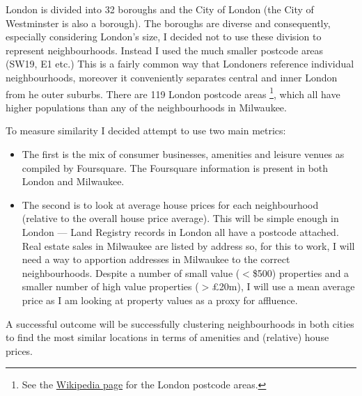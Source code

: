 \documentclass[a4paper,12pt,final,UKenglish]{article}
\begin{document}
            London is divided into 32 boroughs and the City of London (the City of Westminster is also a borough).
            The boroughs are diverse and consequently, especially considering London's size, I decided not to use these division to represent neighbourhoods.
            Instead I used the much smaller postcode areas (SW19, E1 etc.)
            This is a fairly common way that Londoners reference individual neighbourhoods, moreover it conveniently separates central and inner London from he outer suburbs.
            There are 119 London postcode areas%
            \footnote{See the \href{https://en.wikipedia.org/wiki/London\_postal\_district}{Wikipedia page} for the London postcode areas.},
            which all have higher populations than any of the neighbourhoods in Milwaukee.

            To measure similarity I decided attempt to use two main metrics:
            \begin{itemize}
                \item The first is the mix of consumer businesses, amenities and leisure venues as compiled by Foursquare.
                The Foursquare information is present in both London and Milwaukee.
                \item The second is to look at average house prices for each neighbourhood (relative to the overall house price average).
                This will be simple enough in London --- Land Registry records in London all have a postcode attached.
                Real estate sales in Milwaukee are listed by address so, for this to work, I will need a way to apportion addresses in Milwaukee to the correct neighbourhoods.
                Despite a number of small value ($<$\$500) properties and a smaller number of high value properties ($>$£20m),
                I will use a mean average price as I am looking at property values as a proxy for affluence.
            \end{itemize}

            A successful outcome will be successfully clustering neighbourhoods in both cities to find the most similar locations in terms of amenities and (relative) house prices.
\end{document}
